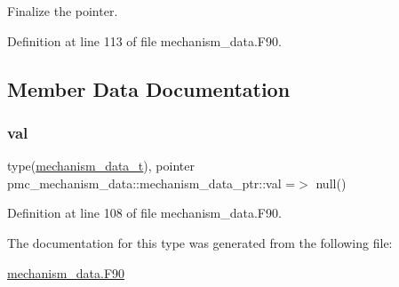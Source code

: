 Finalize the pointer. 



Definition at line 113 of file mechanism\+\_\+data.\+F90.



\subsection{Member Data Documentation}
\mbox{\label{structpmc__mechanism__data_1_1mechanism__data__ptr_a52a87d0bc3de564420eb6be29904081e}} 
\subsubsection{\texorpdfstring{val}{val}}
{\footnotesize\ttfamily type(\mbox{\hyperlink{structpmc__mechanism__data_1_1mechanism__data__t}{mechanism\+\_\+data\+\_\+t}}), pointer pmc\+\_\+mechanism\+\_\+data\+::mechanism\+\_\+data\+\_\+ptr\+::val =$>$ null()\hspace{0.3cm}{\ttfamily [private]}}



Definition at line 108 of file mechanism\+\_\+data.\+F90.



The documentation for this type was generated from the following file\+:\begin{DoxyCompactItemize}
\item 
\mbox{\hyperlink{mechanism__data_8_f90}{mechanism\+\_\+data.\+F90}}\end{DoxyCompactItemize}
